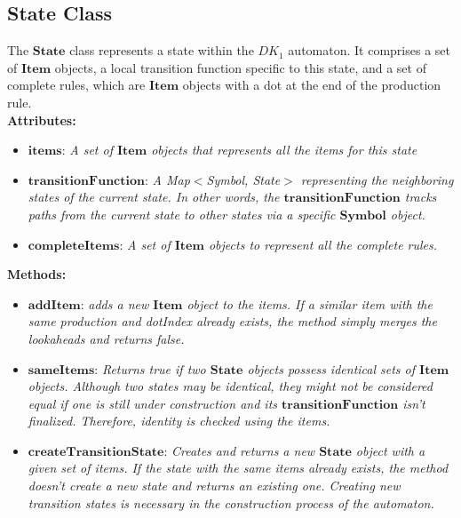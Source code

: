 \subsection{State Class}

The \(\boldsymbol{State}\) class represents a state within the \(DK_{1}\) automaton. It comprises a set of \(\boldsymbol{Item}\) objects, a local transition function specific to this state, and a set of complete rules, which are \(\boldsymbol{Item}\) objects with a dot at the end of the production rule.\\

\textbf{Attributes:}
\begin{itemize}
    \item \(\boldsymbol{items}\): \textit{A set of \(\boldsymbol{Item}\) objects that represents all the items for this state}
    \item \(\boldsymbol{transitionFunction}\): \textit{A Map\(<\)Symbol, State\(>\) representing the neighboring states of the current state. In other words, the \(\boldsymbol{transitionFunction}\) tracks paths from the current state to other states via a specific \(\boldsymbol{Symbol}\) object.}
    \item \(\boldsymbol{completeItems}\): \textit{A set of \(\boldsymbol{Item}\) objects to represent all the complete rules.}
\end{itemize}

\textbf{Methods:}
\begin{itemize}
    \item \(\boldsymbol{addItem}\): \textit{adds a new \(\boldsymbol{Item}\) object to the items. If a similar item with the same production and dotIndex already exists, the method simply merges the lookaheads and returns false.}
    \item \(\boldsymbol{sameItems}\): \textit{Returns true if two \(\boldsymbol{State}\) objects possess identical sets of \(\boldsymbol{Item}\) objects. Although two states may be identical, they might not be considered equal if one is still under construction and its \(\boldsymbol{transitionFunction}\) isn’t finalized. Therefore, identity is checked using the items.}
    \item \(\boldsymbol{createTransitionState}\): \textit{Creates and returns a new \(\boldsymbol{State}\) object with a given set of items. If the state with the same items already exists, the method doesn’t create a new state and returns an existing one. Creating new transition states is necessary in the construction process of the automaton.}
\end{itemize}


